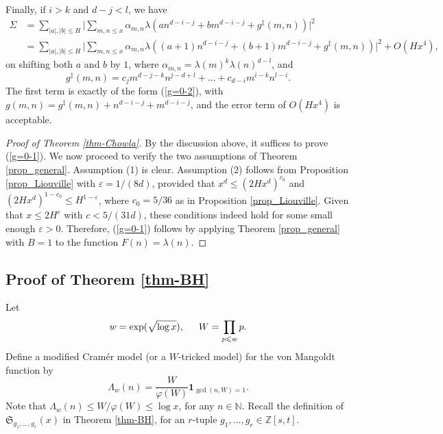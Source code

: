\documentclass[reqno, 11pt]{amsart}
\renewcommand{\leq}{\leqslant}
\theoremstyle{definition}
\theoremstyle{definition}
\renewcommand{\leq}{\leqslant}
\newcommand{\eps}{\varepsilon}
\newcommand{\ZZ}{\mathbb{Z}}
\newcommand{\NN}{\mathbb{N}}
\numberwithin{equation}{section}
\begin{document}
Finally, if $i > k$ and $d-j < l$, we have
\begin{align*}
\Sigma & = \sum_{|a|,|b| \leq H} \Bigg| \sum_{m,n \leq x} \alpha_{m,n} \lambda(an^{d-i-j} + bm^{d-i-j} + g^{\ddagger}(m,n)) \Bigg|^2 \\
& = \sum_{|a|,|b| \leq H} \Bigg| \sum_{m,n \leq x} \alpha_{m,n} \lambda( (a+1)n^{d-i-j} + (b+1)m^{d-i-j} + g^{\ddagger}(m,n)) \Bigg|^2+ O(Hx^4),
\end{align*}
on shifting both $a$ and $b$ by $1$, where $\alpha_{m, n} = \lambda(m)^k \lambda(n)^{d-l}$, and
$$g^{\ddagger}(m, n) = c_j m^{d-j-k} n^{j-d+l} + \dots + c_{d-i}m^{i-k}n^{l-i}.$$ 
The first term is exactly of the form (\ref{g=0-2}), with $g(m, n) = g^{\ddagger}(m,n) + n^{d-i-j} + m^{d-i-j}$, and the error term of $O(Hx^4)$ is acceptable.



\begin{proof}[Proof of Theorem \ref{thm-Chowla}]
By the discussion above, it suffices to prove (\ref{g=0-1}). We now proceed to verify the two assumptions of Theorem \ref{prop_general}. Assumption (1) is clear. Assumption (2) follows from Proposition \ref{prop_Liouville} with $\eps = 1/(8d)$, provided that $x^d \leq (2Hx^d)^{c_0}$ and $(2Hx^d)^{1-c_0} \leq H^{1-\eps}$, where $c_0 = 5/36$ as in Proposition \ref{prop_Liouville}. Given that $x \leq 2H^c$ with $c < 5/(31d)$, these conditions indeed hold for some small enough $\eps>0$. Therefore, (\ref{g=0-1}) follows by applying Theorem \ref{prop_general} with $B = 1$ to the function $F(n) = \lambda(n)$.
\end{proof}





\subsection{Proof of Theorem \ref{thm-BH}}

Let 
\begin{align}\label{w-and-W}
   w = \exp(\sqrt{\log x}), \indent W = \prod_{p \leq w} p.	
\end{align}
Define a modified Cram\'er model (or a $W$-tricked model) for the von Mangoldt function by
$$\Lambda_w(n) = \frac{W}{\varphi(W)} \mathbf{1}_{\gcd(n, W) = 1}.$$
Note that $\Lambda_w(n) \leq W / \varphi(W) \leq \log x$, for any $n \in \NN$. Recall the definition of $\mathfrak{S}_{g_1, \dots, g_r}(x)$ in Theorem \ref{thm-BH}, for an $r$-tuple $g_1, \dots, g_r \in \ZZ[s, t]$.
\end{document}

